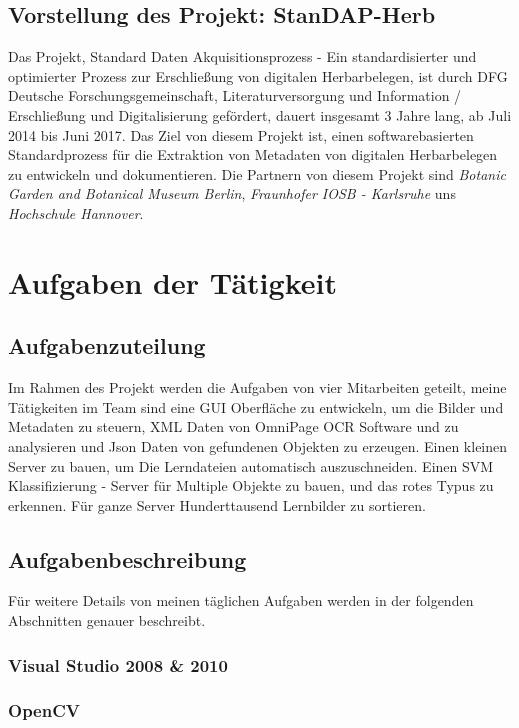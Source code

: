 \documentclass[10pt,a4paper]{report}
\begin{document}
\section{Vorstellung des Projekt: StanDAP-Herb}

Das Projekt, Standard Daten Akquisitionsprozess - Ein standardisierter und optimierter Prozess zur Erschließung von digitalen Herbarbelegen, ist durch DFG Deutsche Forschungsgemeinschaft, Literaturversorgung und Information / Erschließung und Digitalisierung gefördert, dauert insgesamt 3 Jahre lang, ab Juli 2014 bis Juni 2017. Das Ziel von diesem Projekt ist, einen softwarebasierten Standardprozess für die Extraktion von Metadaten von digitalen Herbarbelegen zu entwickeln und dokumentieren. Die Partnern von diesem Projekt sind \textit{Botanic Garden and Botanical Museum Berlin}, \textit{Fraunhofer IOSB - Karlsruhe} uns \textit{Hochschule Hannover}.

\chapter{Aufgaben der Tätigkeit}
\section{Aufgabenzuteilung}

Im Rahmen des Projekt werden die Aufgaben von vier Mitarbeiten geteilt, meine Tätigkeiten im Team sind eine GUI Oberfläche zu entwickeln, um die Bilder und Metadaten zu steuern, XML Daten von OmniPage OCR Software und zu analysieren und Json Daten von gefundenen Objekten zu erzeugen. Einen kleinen Server zu bauen, um Die Lerndateien automatisch auszuschneiden. Einen SVM Klassifizierung - Server für Multiple Objekte zu bauen, und das rotes Typus zu erkennen. Für ganze Server Hunderttausend Lernbilder zu sortieren.

\section{Aufgabenbeschreibung}

Für weitere Details von meinen täglichen Aufgaben werden in der folgenden Abschnitten genauer beschreibt. 

\subsection{Visual Studio 2008 \& 2010}

\subsection{OpenCV}
\end{document}
